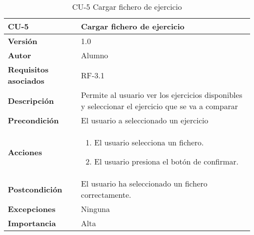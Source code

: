 \begin{table}[p]
	\centering
	\begin{tabularx}{\linewidth}{ p{} p{} }
		\toprule
		\textbf{CU-5}    & \textbf{Cargar fichero de ejercicio}\\
		\toprule
		\textbf{Versión}              & 1.0    \\
		\textbf{Autor}                & Alumno \\
		\textbf{Requisitos asociados} & RF-3.1\\
		\textbf{Descripción}          & Permite al usuario ver los ejercicios disponibles y seleccionar el ejercicio que se va a comparar\\
		\textbf{Precondición}         & El usuario a seleccionado un ejercicio \\
		\textbf{Acciones}             &
		\begin{enumerate}
			\def\labelenumi{\arabic{enumi}.}
			\tightlist
			\item El usuario selecciona un fichero.
			\item El usuario presiona el botón de confirmar.
		\end{enumerate}\\
		\textbf{Postcondición}        & El usuario ha seleccionado un fichero correctamente. \\
		\textbf{Excepciones}          & Ninguna \\
		\textbf{Importancia}          & Alta \\
		\bottomrule
	\end{tabularx}
	\caption{CU-5 Cargar fichero de ejercicio}
\end{table}

